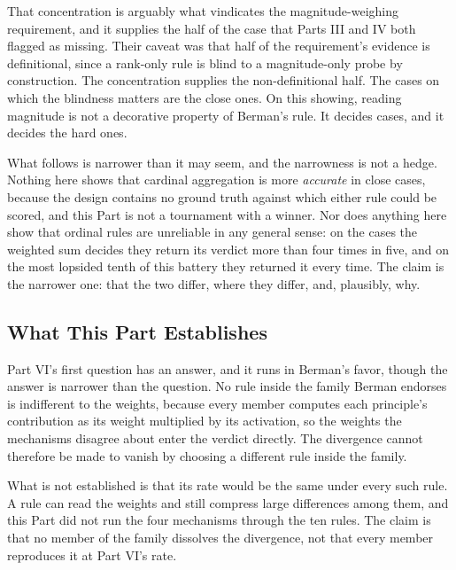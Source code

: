 That concentration is arguably what vindicates the magnitude-weighing
requirement, and it supplies the half of the case that Parts III and IV
both flagged as missing. Their caveat was that half of the requirement's
evidence is definitional, since a rank-only rule is blind to a
magnitude-only probe by construction. The concentration supplies the
non-definitional half. The cases on which the blindness matters are the
close ones. On this showing, reading magnitude is not a decorative property
of Berman's rule. It decides
cases, and it decides the hard ones.

What follows is narrower than it may seem, and the narrowness is not a
hedge. Nothing here shows that cardinal aggregation is more
\textit{accurate} in close cases, because the design contains no ground
truth against which either rule could be scored, and this Part is not a
tournament with a winner. Nor does anything here show that ordinal rules are unreliable in any
general sense: on the cases the weighted sum decides they return its
verdict more than four times in five, and on the most lopsided tenth of
this battery they returned it every time. The claim is the narrower one: that the two differ, where they differ, and,
plausibly, why.

\subsection{What This Part Establishes}

Part VI's first question has an answer, and it runs in Berman's favor, though
the answer is narrower than the question. No rule inside the family Berman
endorses is indifferent to the weights, because every member computes each
principle's contribution as its weight multiplied by its activation, so the
weights the mechanisms disagree about enter the verdict directly. The
divergence cannot therefore be made to vanish by choosing a different rule
inside the family.

What is not established is that its rate would be the same under every such
rule. A rule can read the weights and still compress large differences among
them, and this Part did not run the four mechanisms through the ten rules. The
claim is that no member of the family dissolves the divergence, not that every
member reproduces it at Part VI's rate.

